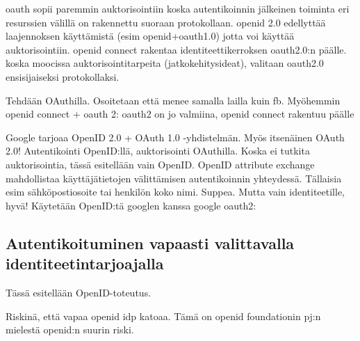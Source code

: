 \documentclass[finnish,gradu]{tktltiki}
\begin{document}
  oauth sopii paremmin auktorisointiin koska autentikoinnin jälkeinen toiminta eri resurssien välillä on rakennettu suoraan protokollaan. openid 2.0 edellyttää laajennoksen käyttämistä (esim openid+oauth1.0) jotta voi käyttää auktorisointiin. openid connect rakentaa identiteettikerroksen oauth2.0:n päälle. koska moocissa auktorisointitarpeita (jatkokehitysideat), valitaan oauth2.0 ensisijaiseksi protokollaksi.


  Tehdään OAuthilla. Osoitetaan että menee samalla lailla kuin fb.
  Myöhemmin openid connect + oauth 2: oauth2 on jo valmiina, openid connect rakentuu päälle


  Google tarjoaa OpenID 2.0 + OAuth 1.0 -yhdistelmän. Myös itsenäinen OAuth 2.0!  Autentikointi OpenID:llä, auktorisointi OAuthilla. Koska ei tutkita auktorisointia, tässä esitellään vain OpenID.
  OpenID attribute exchange mahdollistaa käyttäjätietojen välittämisen autentikoinnin yhteydessä. Tällaisia esim sähköpostiosoite tai henkilön koko nimi. Suppea. Mutta vain identiteetille, hyvä!
  Käytetään OpenID:tä googlen kanssa google oauth2: \cite{google_oauth2_doc}




  \subsection{Autentikoituminen vapaasti valittavalla identiteetintarjoajalla} %
  \label{sub:autentikoituminen_käyttäjäkeskeisellä_identiteetillä}

  Tässä esitellään OpenID-toteutus.

  Riskinä, että vapaa openid idp katoaa. Tämä on openid foundationin pj:n mielestä openid:n suurin riski.
\end{document}
